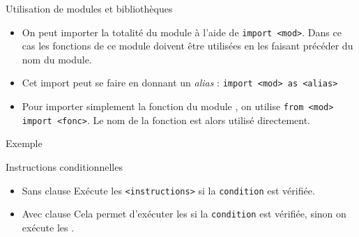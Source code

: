 \documentclass[10pt]{beamer}
\begin{document}
\begin{frame}[fragile]{\Ctitle}{\stitle}
	\begin{alertblock}{Utilisation de modules et bibliothèques}
		\begin{itemize}
			\item<1-> On peut importer la totalité du module  à l'aide de \texttt{import <mod>}. Dans ce cas les fonctions de ce module doivent être utilisées en les faisant précéder du nom du module.
			\item<2-> Cet import peut se faire en donnant un \textit{alias} : \texttt{import <mod> as <alias>}
			\item<3-> Pour importer simplement la fonction  du module , on utilise \texttt{from <mod> import <fonc>}. Le nom de la fonction est alors utilisé directement.
		\end{itemize}
	\end{alertblock}
	\begin{exampleblock}{Exemple}
		\onslide<4-> 
		\onslide<5-> 
	\end{exampleblock}
\end{frame}


\begin{frame}[fragile]{\Ctitle}{\stitle}
	\begin{alertblock}{Instructions conditionnelles}
		\begin{itemize}
			\item<1-> Sans clause 
				Exécute les {\tt <instructions>} si la {\tt condition} est vérifiée.
			\item<2-> Avec clause 
				Cela permet d'exécuter les {\tt <instructions1>} si la {\tt condition} est vérifiée, sinon on exécute les {\tt <instructions2>}.
		\end{itemize}
	\end{alertblock}
\end{frame}
\end{document}
